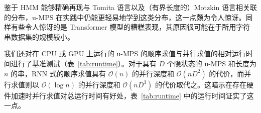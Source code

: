 鉴于 HMM 能够精确再现与 Tomita 语言以及（有界长度的）Motzkin 语言相关联的分布，u-MPS 在实践中仍能更轻易地学到这类分布，这一点颇为令人惊讶。同样有些令人惊讶的是 Transformer 模型的糟糕表现，其原因很可能在于所用字符串数据集的规模较小。

我们还对在 CPU 或 GPU 上运行的 u-MPS 的顺序求值与并行求值的相对运行时间进行了基准测试（表~\ref{tab:runtime}）。对于具有 $D$ 个隐状态的 u-MPS 和长度为 $n$ 的串，RNN 式的顺序求值具有 $\mathcal{O}(n)$ 的并行深度和 $\mathcal{O}(nD^2)$ 的代价，而并行求值则以 $\mathcal{O}(\log n)$ 的并行深度和 $\mathcal{O}(nD^3)$ 的代价取代之。这暗示在存在硬件加速时并行求值对总运行时间有好处，表~\ref{tab:runtime} 中的运行时间证实了这一点。

